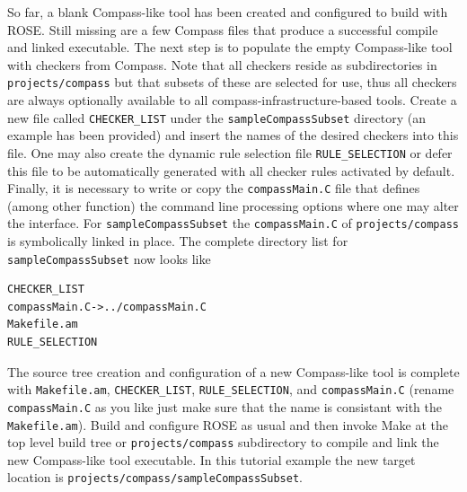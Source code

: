 So far, a blank Compass-like tool has been created and configured to build with
ROSE. Still missing are a few Compass files that produce a successful
compile and linked executable. The next step is to populate the empty 
Compass-like tool with checkers from Compass. Note that all checkers
reside as subdirectories in {\tt projects/compass} but that subsets of
these are selected for use, thus all checkers are always optionally available 
to all compass-infrastructure-based tools.  Create a new file called
{\tt CHECKER\_LIST} under the {\tt sampleCompassSubset} directory (an
example has been provided) and insert the names of the desired checkers into
this file. One may also create the dynamic rule selection file 
{\tt RULE\_SELECTION} or defer this file to be automatically generated with
all checker rules activated by default. Finally, it is necessary to write or
copy the {\tt compassMain.C} file that defines (among other function)
the command line processing options where one may alter the interface. 
For {\tt sampleCompassSubset} the {\tt compassMain.C} of {\tt projects/compass} 
is symbolically linked in place. The complete directory list for 
{\tt sampleCompassSubset} now looks like

\begin{verbatim}
CHECKER_LIST
compassMain.C->../compassMain.C
Makefile.am
RULE_SELECTION
\end{verbatim}
%

The source tree creation and configuration of a new Compass-like tool is 
complete with {\tt Makefile.am}, {\tt CHECKER\_LIST}, {\tt RULE\_SELECTION},
and {\tt compassMain.C} (rename {\tt compassMain.C} as you like just make
sure that the name is consistant with the {\tt Makefile.am}). Build and 
configure ROSE as usual and then invoke Make at the top level build tree 
or {\tt projects/compass} subdirectory to
compile and link the new Compass-like tool executable. In this tutorial 
example the new target location is {\tt projects/compass/sampleCompassSubset}.
